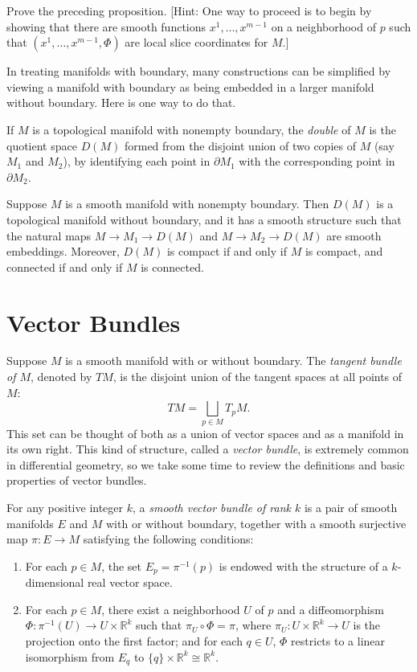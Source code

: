 \begin{exercise}
\label{exer:prove-lagrange-multiplier}
Prove the preceding proposition. [Hint: One way to proceed is to begin by showing that there are smooth functions $x^1, \ldots, x^{m-1}$ on a neighborhood of $p$ such that $(x^1, \ldots, x^{m-1}, \Phi)$ are local slice coordinates for $M$.]
\end{exercise}

In treating manifolds with boundary, many constructions can be simplified by viewing a manifold with boundary as being embedded in a larger manifold without boundary. Here is one way to do that.

If $M$ is a topological manifold with nonempty boundary, the \emph{double} of $M$ is the quotient space $D(M)$ formed from the disjoint union of two copies of $M$ (say $M_1$ and $M_2$), by identifying each point in $\partial M_1$ with the corresponding point in $\partial M_2$.

\begin{proposition}
\label{prop:double-manifold}
Suppose $M$ is a smooth manifold with nonempty boundary. Then $D(M)$ is a topological manifold without boundary, and it has a smooth structure such that the natural maps $M \to M_1 \to D(M)$ and $M \to M_2 \to D(M)$ are smooth embeddings. Moreover, $D(M)$ is compact if and only if $M$ is compact, and connected if and only if $M$ is connected.
\end{proposition}

\section{Vector Bundles}

Suppose $M$ is a smooth manifold with or without boundary. The \emph{tangent bundle of $M$}, denoted by $TM$, is the disjoint union of the tangent spaces at all points of $M$:
\[
TM = \bigsqcup_{p \in M} T_p M.
\]
This set can be thought of both as a union of vector spaces and as a manifold in its own right. This kind of structure, called a \emph{vector bundle}, is extremely common in differential geometry, so we take some time to review the definitions and basic properties of vector bundles.

For any positive integer $k$, a \emph{smooth vector bundle of rank $k$} is a pair of smooth manifolds $E$ and $M$ with or without boundary, together with a smooth surjective map $\pi : E \to M$ satisfying the following conditions:
\begin{enumerate}
\item[(i)] For each $p \in M$, the set $E_p = \pi^{-1}(p)$ is endowed with the structure of a $k$-dimensional real vector space.
\item[(ii)] For each $p \in M$, there exist a neighborhood $U$ of $p$ and a diffeomorphism $\Phi : \pi^{-1}(U) \to U \times \mathbb{R}^k$ such that $\pi_U \circ \Phi = \pi$, where $\pi_U : U \times \mathbb{R}^k \to U$ is the projection onto the first factor; and for each $q \in U$, $\Phi$ restricts to a linear isomorphism from $E_q$ to $\{q\} \times \mathbb{R}^k \cong \mathbb{R}^k$.
\end{enumerate}

